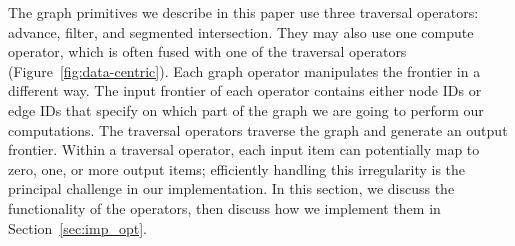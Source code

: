 \documentclass[format=acmsmall,review=false,screen=true]{acmart}
\begin{document}
The graph primitives we describe in this paper use three traversal
operators: advance, filter, and segmented intersection. They may also
use one compute operator, which is often fused with one of the
traversal operators (Figure~\ref{fig:data-centric}). Each graph
operator manipulates the frontier in a different way. The input
frontier of each operator contains either node IDs or edge IDs that
specify on which part of the graph we are going to perform our
computations. The traversal operators traverse the graph and generate
an output frontier. Within a traversal operator, each input item can
potentially map to zero, one, or more output items; efficiently
handling this irregularity is the principal challenge in our
implementation. In this section, we discuss the functionality of the
operators, then discuss how we implement them in
Section~\ref{sec:imp_opt}.
\end{document}

